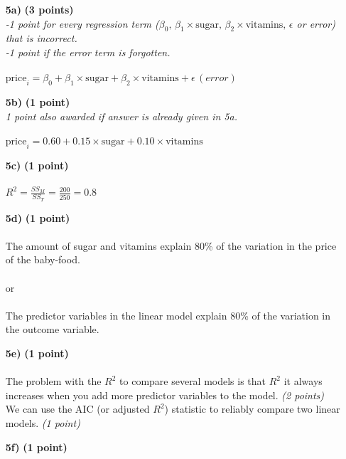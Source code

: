 \begin{itemize}
\item[\textbf{5a)}] \textbf{(3 points)} \\
\textit{-1 point for every regression term ($\beta_0,\, \beta_1 \times \text{sugar},\, \beta_2 \times \text{vitamins},\, \epsilon$ or error) that is incorrect. \\-1 point if the error term is forgotten.} \\ \\ 
$\text{price}_i = \beta_0 + \beta_1 \times \text{sugar} + \beta_2 \times \text{vitamins} + \epsilon\, (error)$ \\
\item[\textbf{5b)}] \textbf{(1 point)} \\
\textit{1 point also awarded if answer is already given in 5a.} \\ \\ 
$\text{price}_i = 0.60 + 0.15 \times \text{sugar} + 0.10 \times \text{vitamins}$ \\
\item[\textbf{5c)}] \textbf{(1 point)} \\ \\ 
$R^2 = \frac{SS_M}{SS_T} = \frac{200}{250} = 0.8$ \\
\item[\textbf{5d)}] \textbf{(1 point)} \\ \\ 
The amount of sugar and vitamins explain 80\% of the variation in the price of the baby-food. \\ \\ 
or \\ \\ 
The predictor variables in the linear model explain 80\% of the variation in the outcome variable. \\
\item[\textbf{5e)}] \textbf{(1 point)} \\ \\
The problem with the $R^2$ to compare several models is that $R^2$ it always \\increases when you add more predictor variables to the model. \textit{(2 points)} \\
We can use the AIC (or adjusted $R^2$) statistic to reliably compare two linear models. \textit{(1 point)} \\
\item[\textbf{5f)}] \textbf{(1 point)} \\ \\

\end{itemize}
